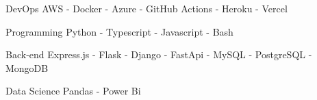 

\begin{cvskills}

  \cvskill
    {DevOps} %
    {AWS - Docker - Azure - GitHub Actions - Heroku - Vercel} %

  \cvskill
    {Programming} %
    {Python - Typescript - Javascript - Bash} %

  \cvskill
    {Back-end} %
    {Express.js - Flask - Django - FastApi -  MySQL - PostgreSQL - MongoDB} %

  \cvskill
    {Data Science} %
    {Pandas - Power Bi} %

\end{cvskills}
